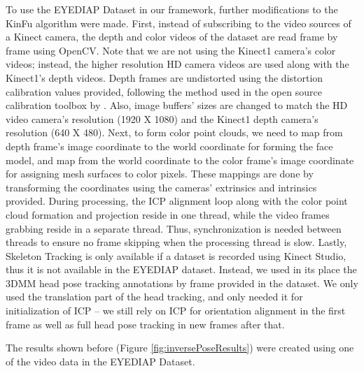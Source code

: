\documentclass{ut-thesis}
\begin{document}
To use the EYEDIAP Dataset in our framework, further modifications to the KinFu algorithm were made.  First, instead of subscribing to the video sources of a Kinect camera, the depth and color videos of the dataset are read frame by frame using OpenCV.  Note that we are not using the Kinect1 camera's color videos; instead, the higher resolution HD camera videos are used along with the Kinect1's depth videos.  Depth frames are undistorted using the distortion calibration values provided, following the method used in the open source calibration toolbox by \cite{herrera2012joint}.  Also, image buffers' sizes are changed to match the HD video camera's resolution (1920 X 1080) and the Kinect1 depth camera's resolution (640 X 480).  Next, to form color point clouds, we need to map from depth frame's image coordinate to the world coordinate for forming the face model, and map from the world coordinate to the color frame's image coordinate for assigning mesh surfaces to color pixels.  These mappings are done by transforming the coordinates using the cameras' extrinsics and intrinsics provided.  During processing, the ICP alignment loop along with the color point cloud formation and projection reside in one thread, while the video frames grabbing reside in a separate thread.  Thus, synchronization is needed between threads to ensure no frame skipping when the processing thread is slow.  Lastly, Skeleton Tracking is only available if a dataset is recorded using Kinect Studio, thus it is not available in the EYEDIAP dataset.  Instead, we used in its place the 3DMM head pose tracking annotations by frame provided in the dataset.  We only used the translation part of the head tracking, and only needed it for initialization of ICP -- we still rely on ICP for orientation alignment in the first frame as well as full head pose tracking in new frames after that.

The results shown before (Figure \ref{fig:inversePoseResults}) were created using one of the video data in the EYEDIAP Dataset.




\end{document}
